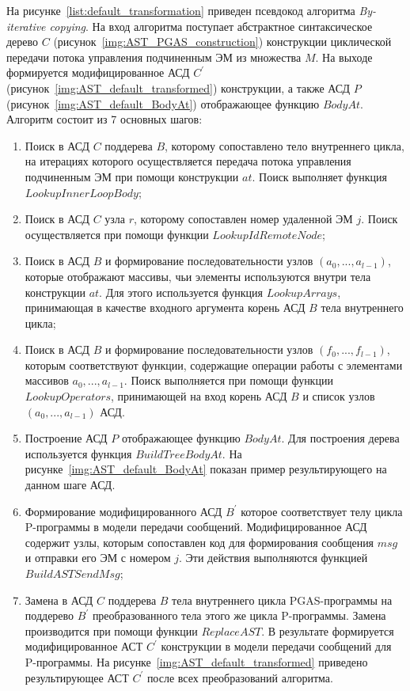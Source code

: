 На рисунке~\ref{list:default_transformation} приведен псевдокод алгоритма \textit{By-iterative copying}. На вход алгоритма поступает абстрактное синтаксическое дерево $C$ (рисунок~\ref{img:AST_PGAS_construction}) конструкции циклической передачи потока управления подчиненным ЭМ из множества $M$. На выходе формируется модифицированное АСД $C^{\prime}$ (рисунок~\ref{img:AST_default_transformed}) конструкции, а также АСД $P$ (рисунок~\ref{img:AST_default_BodyAt}) отображающее функцию $BodyAt$. Алгоритм состоит из 7 основных шагов:
\begin{enumerate}
\item Поиск в АСД $C$ поддерева $B$, которому сопоставлено тело внутреннего цикла, на итерациях которого осуществляется передача потока управления подчиненным ЭМ при помощи конструкции $at$. Поиск выполняет функция $LookupInnerLoopBody$;
\item Поиск в АСД $C$ узла $r$, которому сопоставлен номер удаленной ЭМ $j$. Поиск осуществляется при помощи функции $LookupIdRemoteNode$;
\item Поиск в АСД $B$ и формирование последовательности узлов $(a_{0},...,a_{l-1})$, которые отображают массивы, чьи элементы используются внутри тела конструкции $at$. Для этого используется функция $LookupArrays$, принимающая в качестве входного аргумента корень АСД $B$ тела внутреннего цикла;
\item Поиск в АСД $B$ и формирование последовательности узлов $(f_{0},...,f_{l-1})$, которым соответствуют функции, содержащие операции работы с элементами массивов $a_{0},...,a_{l-1}$. Поиск выполняется при помощи функции $LookupOperators$, принимающей на вход корень АСД $B$ и список узлов $(a_{0},...,a_{l-1})$ АСД.
\item Построение АСД $P$ отображающее функцию $BodyAt$. Для построения дерева используется функция $BuildTreeBodyAt$. На рисунке~\ref{img:AST_default_BodyAt} показан пример результирующего на данном шаге АСД.
\item Формирование модифицированного АСД $B^{\prime}$ которое соответствует телу цикла P-программы в модели передачи сообщений. Модифицированное АСД содержит узлы, которым сопоставлен код для формирования сообщения $msg$ и отправки его ЭМ с номером $j$. Эти действия выполняются функцией $BuildASTSendMsg$;
\item Замена в АСД $C$ поддерева $B$ тела внутреннего цикла PGAS-программы на поддерево $B^{\prime}$ преобразованного тела этого же цикла P-программы. Замена производится при помощи функции $ReplaceAST$. В результате формируется модифицированное АСТ $C^{\prime}$ конструкции в модели передачи сообщений для P-программы. На рисунке~\ref{img:AST_default_transformed} приведено результирующее АСТ $C^{\prime}$ после всех преобразований алгоритма.
\end{enumerate}

